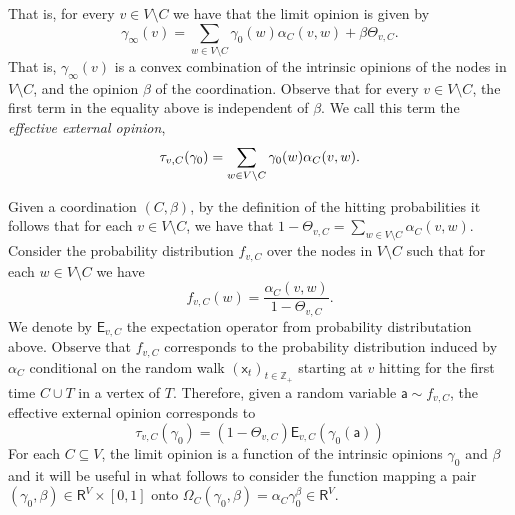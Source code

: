 \documentclass[letterpaper,11pt]{article}
\newcommand{\PP}{\mathbb{P}}
\newcommand{\RR}{\mathsf{R}}
\newcommand{\ZZ}{\mathbb{Z}}
\newcommand{\EE}{\mathsf{E}}
\newcommand{\vvcom}[1]{\todo[color=red!25!white]{Victor: #1}}
\begin{document}
\noindent That is, for every $v\in V\setminus C$ we have that the limit opinion is given by
\begin{equation}
\label{eq:limit-opinion}
\gamma_{\infty}(v)=\sum_{w\in V\setminus C}\gamma_0(w)\alpha_C(v,w)+\beta\Theta_{v,C}.
\end{equation}
That is, $\gamma_{\infty}(v)$ is a convex combination of the intrinsic opinions of the nodes in $V\setminus C$, and the opinion $\beta$ of the coordination. 
Observe that for every $v\in V\setminus C$, the first term in the equality above is independent of $\beta$.
We call this term the {\it effective external opinion},
\begin{equation}
\label{eq:limit-0}
\tau_{v,C}(\gamma_0)=\sum_{w\in V\setminus C}\gamma_0(w)\alpha_C(v,w).\\
\end{equation}

Given a coordination $(C,\beta)$, by the definition of the hitting probabilities it follows that for each $v\in V\setminus C$, we have that $1-\Theta_{v,C}=\sum_{w\in V\setminus C}\alpha_C(v,w)$.
Consider the probability distribution $f_{v,C}$ over the nodes in $V\setminus C$ such that for each $w\in V\setminus C$ we have 
\begin{equation*}
f_{v,C}(w)=\frac{\alpha_C(v,w)}{1-\Theta_{v,C}}.
\end{equation*}
We denote by $\EE_{v,C}$ the expectation operator from probability distributation above.
Observe that $f_{v,C}$ corresponds to the probability distribution induced by $\alpha_C$ conditional on the random walk $(\mathsf{x}_t)_{t\in \ZZ_+}$ starting at $v$ hitting for the first time $C\cup T$ in a vertex of $T$.
Therefore, given a random variable $\mathsf{a}\sim f_{v,C}$, the effective external opinion corresponds to 
\begin{equation*}
\tau_{v,C}(\gamma_0)=(1-\Theta_{v,C})\EE_{v,C}(\gamma_0(\mathsf{a}))
\end{equation*}
For each $C\subseteq V$, the limit opinion is a function of the intrinsic opinions $\gamma_0$ and $\beta$ and it will be useful in what follows to consider the function mapping a pair $(\gamma_0,\beta)\in \RR^V\times [0,1]$ onto $\Omega_C(\gamma_0,\beta)=\alpha_C \gamma_0^{\beta}\in \RR^V$.\\
\end{document}
